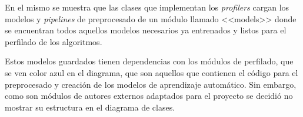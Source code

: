 En el mismo se muestra que las clases que implementan los \textit{profilers} cargan los modelos y \textit{pipelines} de preprocesado de un módulo llamado <<models>> donde se encuentran todos aquellos modelos necesarios ya entrenados y listos para el perfilado de los algoritmos.

Estos modelos guardados tienen dependencias con los módulos de perfilado, que se ven color azul en el diagrama, que son aquellos que contienen el código para el preprocesado y creación de los modelos de aprendizaje automático. Sin embargo, como son módulos de autores externos adaptados para el proyecto se decidió no mostrar su estructura en el diagrama de clases.

